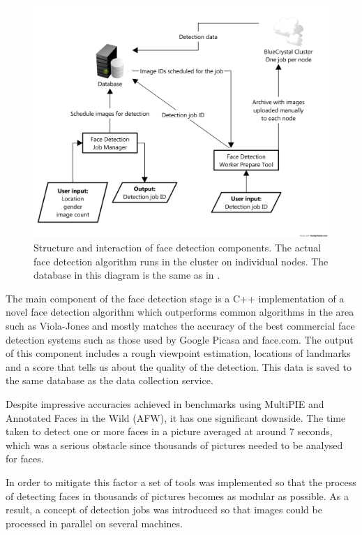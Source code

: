 \begin{figure}
\begin{center}
    \includegraphics[width=\textwidth]{figures/spec/diagram_detection}
\end{center}
\caption{Structure and interaction of face detection components. The actual
face detection algorithm runs in the cluster on individual nodes. The database
in this diagram is the same as in .}
\label{fig:spec:diagram_detection}
\end{figure}

The main component of the face detection stage is a C++ implementation of a
novel face detection algorithm which outperforms common algorithms in the area
such as Viola-Jones and mostly matches the accuracy of the best commercial face
detection systems such as those used by Google Picasa and face.com. The output
of this component includes a rough viewpoint estimation, locations of landmarks
and a score that tells us about the quality of the detection. This data is
saved to the same database as the data collection service.

Despite impressive accuracies achieved in benchmarks using MultiPIE and
Annotated Faces in the Wild (AFW), it has one significant downside. The time
taken to detect one or more faces in a picture averaged at around 7 seconds,
which was a serious obstacle since thousands of pictures needed to be analysed
for faces.

In order to mitigate this factor a set of tools was implemented so that the
process of detecting faces in thousands of pictures becomes as modular as
possible. As a result, a concept of detection jobs was introduced so that images
could be processed in parallel on several machines.

